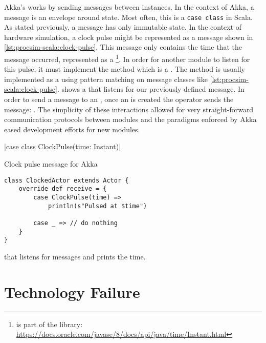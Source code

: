 Akka's \akkaActor{} works by sending messages between \akkaActor{} instances. In the context of Akka, a message is an envelope around state. Most often, this is a \texttt{case class} in Scala. As stated previously, a message has only immutable state. In the context of hardware simulation, a clock pulse might be represented as a message shown in \cref{lst:procsim-scala:clock-pulse}. This message only contains the time that the message occurred, represented as a \footnote{ is part of the  library: \url{https://docs.oracle.com/javase/8/docs/api/java/time/Instant.html}{}}. In order for another module to listen for this pulse, it must implement the  method which is a . The  method is usually implemented as a  using pattern matching \cite{Scala-PatternMatching} on message classes like \cref{lst:procsim-scala:clock-pulse}.  shows a \akkaActor{} that listens for our previously defined  message. In order to send a message to an \akkaActor{}, once an \akkaActor{} is created the \scalainline{!} operator sends the message: . The simplicity of these interactions allowed for very straight-forward communication protocols between modules and the paradigms enforced by Akka eased development efforts for new modules. 

\begin{listing}
    |case class ClockPulse(time: Instant)|
    \caption{Clock pulse message for Akka}
    \label{lst:procsim-scala:clock-pulse}
\end{listing}

\begin{listing}
\begin{verbatim}
class ClockedActor extends Actor {
    override def receive = {
        case ClockPulse(time) => 
            println(s"Pulsed at $time")
        
        case _ => // do nothing
    }
}
\end{verbatim}
\caption{\akkaActor{} that listens for  messages and prints the time.}
\label{lst:procsim-scala:clock-pulse-actor}
\end{listing}


\section{Technology Failure}

